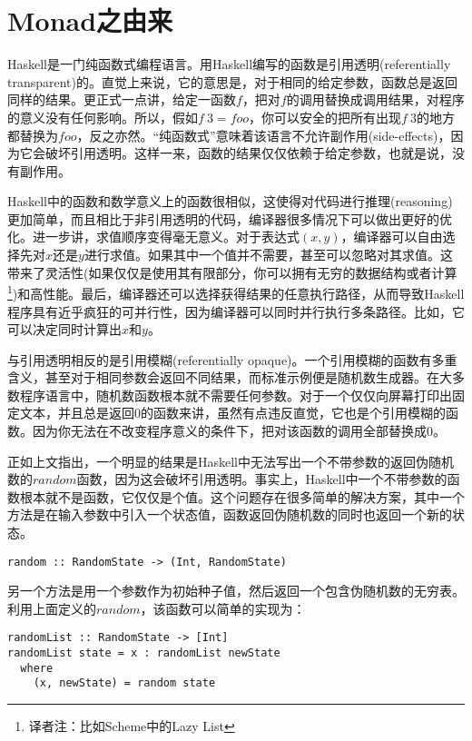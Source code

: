 \section{Monad之由来}

Haskell是一门纯函数式编程语言。用Haskell编写的函数是引用透明(referentially transparent)的。直觉上来说，它的意思是，对于相同的给定参数，函数总是返回同样的结果。更正式一点讲，给定一函数$f$，把对$f$的调用替换成调用结果，对程序的意义没有任何影响。所以，假如$f\ 3 = foo$，你可以安全的把所有出现$f\ 3$的地方都替换为$foo$，反之亦然。“纯函数式”意味着该语言不允许副作用(side-effects)，因为它会破坏引用透明。这样一来，函数的结果仅仅依赖于给定参数，也就是说，没有副作用。

Haskell中的函数和数学意义上的函数很相似，这使得对代码进行推理(reasoning)更加简单，而且相比于非引用透明的代码，编译器很多情况下可以做出更好的优化。进一步讲，求值顺序变得毫无意义。对于表达式$(x,y)$，编译器可以自由选择先对$x$还是$y$进行求值。如果其中一个值并不需要，甚至可以忽略对其求值。这带来了灵活性(如果仅仅是使用其有限部分，你可以拥有无穷的数据结构或者计算\footnote{译者注：比如Scheme中的Lazy List})和高性能。最后，编译器还可以选择获得结果的任意执行路径，从而导致Haskell程序具有近乎疯狂的可并行性，因为编译器可以同时并行执行多条路径。比如，它可以决定同时计算出$x$和$y$。

与引用透明相反的是引用模糊(referentially opaque)。一个引用模糊的函数有多重含义，甚至对于相同参数会返回不同结果，而标准示例便是随机数生成器。在大多数程序语言中，随机数函数根本就不需要任何参数。对于一个仅仅向屏幕打印出固定文本，并且总是返回$0$的函数来讲，虽然有点违反直觉，它也是个引用模糊的函数。因为你无法在不改变程序意义的条件下，把对该函数的调用全部替换成$0$。

正如上文指出，一个明显的结果是Haskell中无法写出一个不带参数的返回伪随机数的$random$函数，因为这会破坏引用透明。事实上，Haskell中一个不带参数的函数根本就不是函数，它仅仅是个值。这个问题存在很多简单的解决方案，其中一个方法是在输入参数中引入一个状态值，函数返回伪随机数的同时也返回一个新的状态。

\begin{lstlisting}
random :: RandomState -> (Int, RandomState)
\end{lstlisting}

另一个方法是用一个参数作为初始种子值，然后返回一个包含伪随机数的无穷表。利用上面定义的$random$，该函数可以简单的实现为：

\begin{lstlisting}
randomList :: RandomState -> [Int]
randomList state = x : randomList newState
  where
    (x, newState) = random state
\end{lstlisting}

